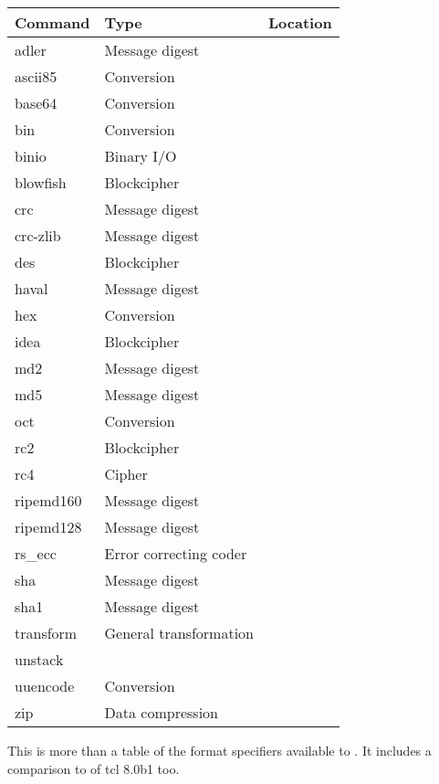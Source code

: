 \documentclass {report}
\begin{document}
\begin {tabular}{|l|l|l|}\hline
	Command		& Type				& Location \\ \hline\hline
	adler		& Message digest		& \zlib	\\ \hline
	ascii85		& Conversion			& \trf	\\ \hline
	base64		& Conversion			& \trf	\\ \hline
	bin		& Conversion			& \trf	\\ \hline
	binio		& Binary I/O			& \trf	\\ \hline
	blowfish	& Blockcipher			& \trf	\\ \hline
	crc		& Message digest		& \trf	\\ \hline
	crc-zlib	& Message digest		& \zlib	\\ \hline
	des		& Blockcipher			& \SSLeay \\ \hline
	haval		& Message digest		& \trf	\\ \hline
	hex		& Conversion			& \trf	\\ \hline
	idea		& Blockcipher			& \trf	\\ \hline
	md2		& Message digest		& \SSLeay \\ \hline
	md5		& Message digest		& \trf	\\ \hline
	oct		& Conversion			& \trf	\\ \hline
	rc2		& Blockcipher			& \SSLeay \\ \hline
	rc4		& Cipher			& \trf	\\ \hline
	ripemd160	& Message digest		& \trf	\\ \hline
	ripemd128	& Message digest		& \trf	\\ \hline
	rs\_ecc		& Error correcting coder	& \trf	\\ \hline
	sha		& Message digest		& \trf	\\ \hline
	sha1		& Message digest		& \SSLeay \\ \hline
	transform	& General transformation	& \trf	\\ \hline
	unstack		&				& \trf	\\ \hline
	uuencode	& Conversion			& \trf	\\ \hline
	zip		& Data compression		& \zlib	\\ \hline
\end {tabular}

This is more than a table of the format specifiers available to
. It includes a comparison to  of tcl
8.0b1 too.
\end{document}
